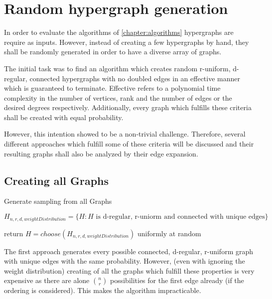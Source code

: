 \chapter{Random hypergraph generation }\label{chapter:random_hypergraphs}
In order to evaluate the algorithms of \cref{chapter:algorithms} hypergraphs are require as inputs. However, instead of creating a few hypergraphs by hand, they shall be randomly generated in order to have a diverse array of graphs.

The initial task was to find an algorithm which creates random r-uniform, d-regular, connected hypergraphs with no doubled edges in an effective manner which is guaranteed to terminate. Effective refers to a polynomial time complexity in the number of vertices, rank and the number of edges or the desired degrees respectively. Additionally, every graph which fulfills these criteria shall be created with equal probability.

However, this intention showed to be a non-trivial challenge. Therefore, several different approaches which fulfill some of these criteria will be discussed and their resulting graphs shall also be analyzed by their edge expansion.
\section{Creating all Graphs}

\begin{algorithm}[htpb]
	\caption{Generate sampling from all Graphs\label{alg:sample_all_graphs}} 
	\begin{algorithmic}
		\State $H_{n,r,d,  weightDistribution} = \{H: H\text{ is d-regular, r-uniorm and connected with unique edges}\}$
	
		\State return $H = choose(H_{n,r,d,  weightDistribution})$ \Comment uniformly at random
		\EndFunction 
	\end{algorithmic}
\end{algorithm}	
The first approach generates every possible connected, d-regular, r-uniform graph with unique edges with the same probability. However, (even with ignoring the weight distribution) creating of all the graphs which fulfill these properties is very expensive as there are alone $n \choose r$ possibilities for the first edge already (if the ordering is considered). This makes the algorithm impracticable. 

